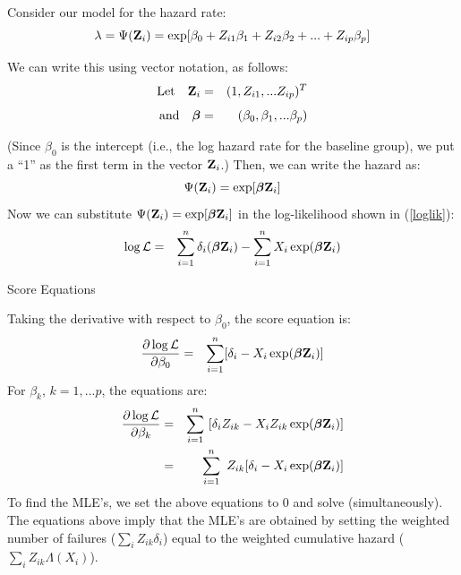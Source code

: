 \documentclass[envcountsect, 10pt, portrait, palatino]{beamer}
\newcommand{\bfbeta}{{\mbox{\boldmath$\beta$}}}
\newcommand{\bfZ}{{\mbox{{\bf Z}}}}
\begin{document}
\begin{frame}
Consider our model for the hazard rate:
\[\lambda = \Psi(\bfZ_i) =
\exp[ \beta_0 + Z_{i1} \beta_1 + Z_{i2} \beta_2 + ... + Z_{ip} \beta_p] \]

We can write this using vector notation, as follows:
\begin{eqnarray*}
\mbox{Let~~~} \bfZ_i & = & (1,Z_{i1},...Z_{ip})^T \\[1ex]
\mbox{and~~~} \bfbeta & = & (\beta_0, \beta_1,...\beta_p)
\end{eqnarray*}

(Since $\beta_0$ is the intercept (i.e., the log hazard rate for
the baseline group), we put a ``1'' as the first term in the vector
$\bfZ_i$.) Then, we can write the hazard as:
\[    \Psi(\bfZ_i) =   \exp[ \bfbeta \bfZ_i ] \]
Now we can substitute $\Psi(\bfZ_i) = \exp[\bfbeta \bfZ_i]$ in the
log-likelihood shown in (\ref{loglik}):
\begin{eqnarray*}
\log {\cal L} & = &
\sum_{i=1}^{n} {\delta_i} (\bfbeta \bfZ_i) -
\sum_{i=1}^{n} X_i\exp( \bfbeta \bfZ_i )
\end{eqnarray*}
\end{frame} 
\begin{frame}{Score Equations}

Taking the derivative with respect to $\beta_0$, the
score equation is:
\begin{eqnarray*}
\frac{\partial\log{\cal L}}{\partial \beta_0}
& =  &  \sum_{i=1}^{n}  [ {\delta_i} - X_i \exp( \bfbeta \bfZ_i )]  \\
\end{eqnarray*}
For $\beta_k$, $k=1,...p$, the equations are:
\begin{eqnarray*}
\frac{\partial\log{\cal L}}{\partial \beta_k}   & =  &
\sum_{i=1}^{n} ~ [ {\delta_i} Z_{ik} - X_i Z_{ik} \exp( \bfbeta \bfZ_i )]\\
& =  &  \sum_{i=1}^{n} ~ Z_{ik} [{\delta_i} - X_i \exp( \bfbeta \bfZ_i )]
\end{eqnarray*}
To find the MLE's, we set the above equations to 0 and
solve (simultaneously).  The equations above imply that
the MLE's are obtained by setting the weighted number
of failures ($\sum_i Z_{ik} \delta_i$) equal to the weighted
cumulative hazard ($\sum_i Z_{ik} \Lambda(X_i)$).
\end{frame} 
\end{document}
